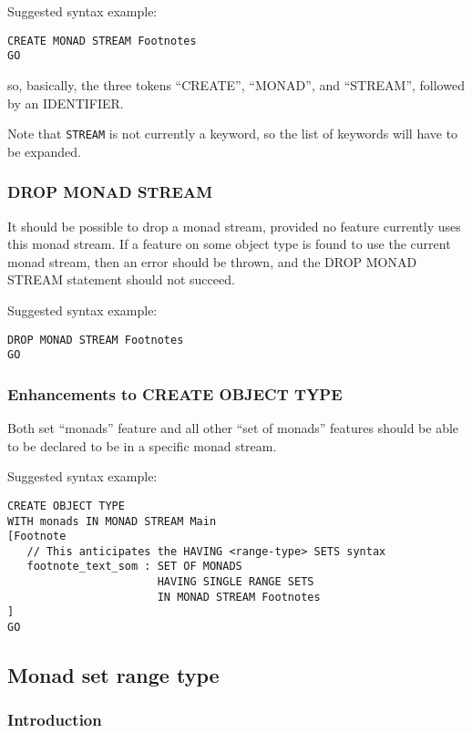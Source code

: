 \documentclass[a4paper,12pt]{article}
\begin{document}
Suggested syntax example:

\begin{verbatim}
CREATE MONAD STREAM Footnotes
GO
\end{verbatim}

\noindent so, basically, the three tokens ``CREATE'', ``MONAD'', and
``STREAM'', followed by an IDENTIFIER.

Note that \texttt{STREAM} is not currently a keyword, so the list of
keywords will have to be expanded.

\subsubsection{DROP MONAD STREAM}

It should be possible to drop a monad stream, provided no feature
currently uses this monad stream.  If a feature on some object type is
found to use the current monad stream, then an error should be thrown,
and the DROP MONAD STREAM statement should not succeed.

Suggested syntax example:

\begin{verbatim}
DROP MONAD STREAM Footnotes
GO
\end{verbatim}

\subsubsection{Enhancements to CREATE OBJECT TYPE}

Both set ``monads'' feature and all other ``set of monads'' features should be able to be declared to be in a specific monad stream.

Suggested syntax example:

\begin{verbatim}
CREATE OBJECT TYPE
WITH monads IN MONAD STREAM Main
[Footnote
   // This anticipates the HAVING <range-type> SETS syntax
   footnote_text_som : SET OF MONADS 
                       HAVING SINGLE RANGE SETS 
                       IN MONAD STREAM Footnotes
]
GO
\end{verbatim}

\subsection{Monad set range type}

\subsubsection{Introduction}
\end{document}
